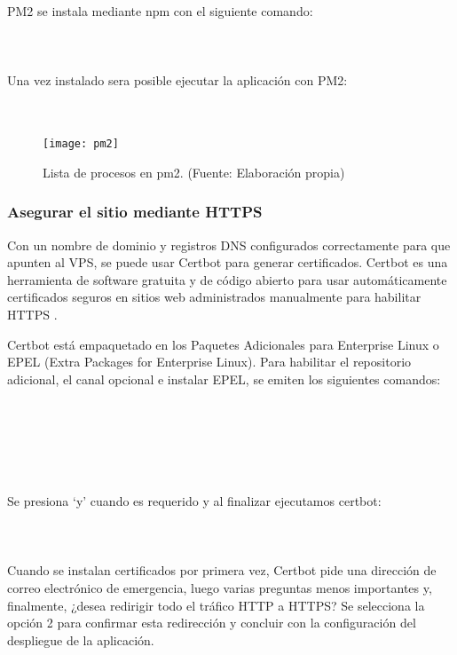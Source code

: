 PM2 se instala mediante npm con el siguiente comando:\\
\\
\\
\\
Una vez instalado sera posible ejecutar la aplicación con PM2:\\
\\
\\

\begin{figure}[H]
  \centering
  \texttt{[image: pm2]}
  \caption{Lista de procesos en pm2. (Fuente: Elaboración propia)}
\end{figure}

\subsubsection{Asegurar el sitio mediante HTTPS}
Con un nombre de dominio y registros DNS configurados correctamente para que apunten al VPS, se puede usar Certbot para generar certificados. Certbot es una herramienta de software gratuita y de código abierto para usar automáticamente certificados seguros en sitios web administrados manualmente para habilitar HTTPS \cite{certbot}.
\vspace{0.8cm}

Certbot está empaquetado en los Paquetes Adicionales para Enterprise Linux o EPEL (Extra Packages for Enterprise Linux). Para habilitar el repositorio adicional, el canal opcional e instalar EPEL, se emiten los siguientes comandos:\\
\\
\\
\\
\\
\\
\\
Se presiona `y' cuando es requerido y al finalizar ejecutamos certbot:\\
\\
\\
\\
Cuando se instalan certificados por primera vez, Certbot pide una dirección de correo electrónico de emergencia, luego varias preguntas menos importantes y, finalmente, ¿desea redirigir todo el tráfico HTTP a HTTPS? Se selecciona la opción 2 para confirmar esta redirección y concluir con la configuración del despliegue de la aplicación.
\vspace{0.8cm}

